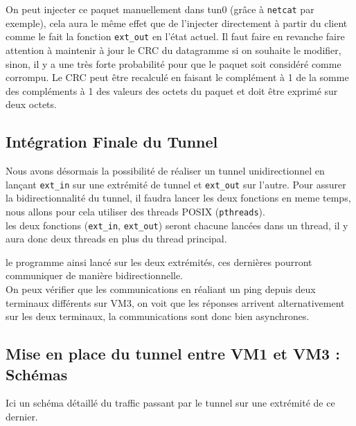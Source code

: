 \documentclass[a4paper, 10pt]{article}
\begin{document}
      On peut injecter ce paquet manuellement dans tun0 (grâce à \verb+netcat+
      par exemple), cela aura le même effet que de l'injecter directement à
      partir du client comme le fait la fonction \verb+ext_out+ en l'état
      actuel. Il faut faire en revanche faire attention à maintenir à jour le
      CRC du datagramme si on souhaite le modifier, sinon, il y a une très forte
      probabilité pour que le paquet soit considéré comme corrompu. Le CRC peut
      être recalculé en faisant le complément à 1 de la somme des compléments à
      1 des valeurs des octets du paquet et doit être exprimé sur deux octets.

    \subsection{Intégration Finale du Tunnel}
      Nous avons désormais la possibilité de réaliser un tunnel unidirectionnel
      en lançant \verb+ext_in+ sur une extrémité de tunnel et \verb+ext_out+ sur
      l'autre. Pour assurer la bidirectionnalité du tunnel, il faudra lancer les
      deux fonctions en meme temps, nous allons pour cela utiliser des threads
      POSIX (\verb+pthreads+). \\

      les deux fonctions (\verb+ext_in+, \verb+ext_out+) seront chacune lancées
      dans un thread, il y aura donc deux threads en plus du thread principal.

      le programme ainsi lancé sur les deux extrémités, ces dernières pourront
      communiquer de manière bidirectionnelle. \\

      On peux vérifier que les communications en réaliant un ping depuis deux
      terminaux différents sur VM3, on voit que les réponses arrivent
      alternativement sur les deux terminaux, la communications sont donc bien
      asynchrones.

    \newpage
    \subsection{Mise en place du tunnel entre VM1 et VM3 : Schémas}
      Ici un schéma détaillé du traffic passant par le tunnel sur une extrémité
      de ce dernier.
\end{document}
